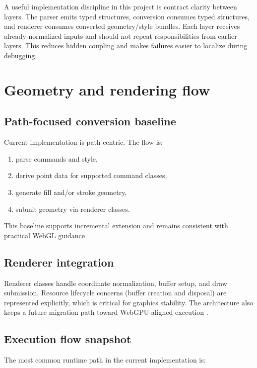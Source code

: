 A useful implementation discipline in this project is contract clarity between layers.
The parser emits typed structures, conversion consumes typed structures, and renderer consumes converted geometry/style bundles.
Each layer receives already-normalized inputs and should not repeat responsibilities from earlier layers.
This reduces hidden coupling and makes failures easier to localize during debugging.

\section{Geometry and rendering flow}

\subsection{Path-focused conversion baseline}

Current implementation is path-centric.
The flow is:

\begin{enumerate}
\item parse commands and style,
\item derive point data for supported command classes,
\item generate fill and/or stroke geometry,
\item submit geometry via renderer classes.
\end{enumerate}

This baseline supports incremental extension and remains consistent with practical WebGL guidance \cite{webgl_fundamentals,khronos_webgl_spec}.

\subsection{Renderer integration}

Renderer classes handle coordinate normalization, buffer setup, and draw submission.
Resource lifecycle concerns (buffer creation and disposal) are represented explicitly, which is critical for graphics stability.
The architecture also keeps a future migration path toward WebGPU-aligned execution \cite{webgpu_fundamentals,w3c_webgpu}.

\subsection{Execution flow snapshot}

The most common runtime path in the current implementation is:

